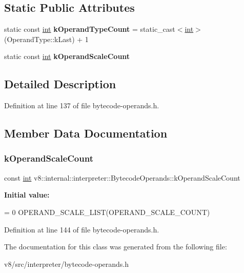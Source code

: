 \subsection*{Static Public Attributes}
\begin{DoxyCompactItemize}
\item 
\mbox{\label{classv8_1_1internal_1_1interpreter_1_1BytecodeOperands_ac940ae2f66cada5fb19f8195b8905189}} 
static const \mbox{\hyperlink{classint}{int}} {\bfseries k\+Operand\+Type\+Count} = static\+\_\+cast$<$\mbox{\hyperlink{classint}{int}}$>$(Operand\+Type\+::k\+Last) + 1
\item 
static const \mbox{\hyperlink{classint}{int}} {\bfseries k\+Operand\+Scale\+Count}
\end{DoxyCompactItemize}


\subsection{Detailed Description}


Definition at line 137 of file bytecode-\/operands.\+h.



\subsection{Member Data Documentation}
\mbox{\label{classv8_1_1internal_1_1interpreter_1_1BytecodeOperands_a8d859ef9c91b3ea1bc2ebcee8186af2d}} 
\subsubsection{\texorpdfstring{k\+Operand\+Scale\+Count}{kOperandScaleCount}}
{\footnotesize\ttfamily const \mbox{\hyperlink{classint}{int}} v8\+::internal\+::interpreter\+::\+Bytecode\+Operands\+::k\+Operand\+Scale\+Count\hspace{0.3cm}{\ttfamily [static]}}

{\bfseries Initial value\+:}
\begin{DoxyCode}
=
      0 OPERAND\_SCALE\_LIST(OPERAND\_SCALE\_COUNT)
\end{DoxyCode}


Definition at line 144 of file bytecode-\/operands.\+h.



The documentation for this class was generated from the following file\+:\begin{DoxyCompactItemize}
\item 
v8/src/interpreter/bytecode-\/operands.\+h\end{DoxyCompactItemize}
